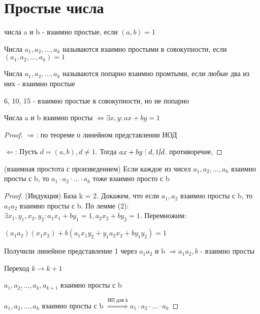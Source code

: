 \section{Простые числа}

\begin{definition}
  числа a и b - взаимно простые, если $(a, b) = 1$
\end{definition}

\begin{definition}
  Числа $a_1, a_2, \ldots, a_k$ называются взаимно простыми в совокупности, если $(a_1, a_2, \ldots, a_k) = 1$
\end{definition}

\begin{definition}
  Числа $a_1, a_2, \ldots, a_k$ называются попарно взаимно промтыми, если любые два из них - взаимно простые
\end{definition}

\begin{eg}
  6, 10, 15 - взаимно простые в совокупности, но не попарно
\end{eg}

\begin{lemma}
  Числа a и b взаимно просты $\Leftrightarrow \exists x, y: ax + by = 1$
\end{lemma}

\begin{proof}
  $\Rightarrow$: по теореме о линейном представлении НОД

  $\Leftarrow$: Пусть $d = (a, b), d \neq 1$. Тогда $ax + by \divby d, 1 \cancel{\divby} d$. противоречие,
\end{proof}

\begin{property} (взаимная простота с произведением)
  Если каждое из чисел $a_1, a_2, \ldots, a_k$ взаимно просты с b, то $a_1 \cdot a_2 \cdot \ldots \cdot a_k$ тоже взаимно просто с b
\end{property}

\begin{proof} (Индукция)
  База k = 2. Докажем, что если $a_1, a_2$ взаимно просты с b, то $a_1a_2$ взаимно просты с b.
  По лемме (2): $\exists x_1, y_1, x_2, y_2: a_1x_1 + by_1 = 1, a_2x_2 + by_2 = 1$. Перемножим:
  
  
  $(a_1a_2)(x_1x_2) + b(a_1x_1y_2 + y_1a_2x_2 + by_1y_2) = 1$

  Получили линейное представление 1 через $a_1a_2$ и b $\Rightarrow a_1a_2, b$  - взаимно просты

  Переход $k \to k + 1$

  $\underline{a_1, a_2, \ldots, a_k}, a_{k+1}$ взаимно просты с b

  $a_1, a_2, \ldots, a_k$ взаимно просты с b $\overset{\text{ИП для k}}{\Rightarrow} a_1 \cdot a_2 \cdot \ldots \cdot a_k$
\end{proof}

